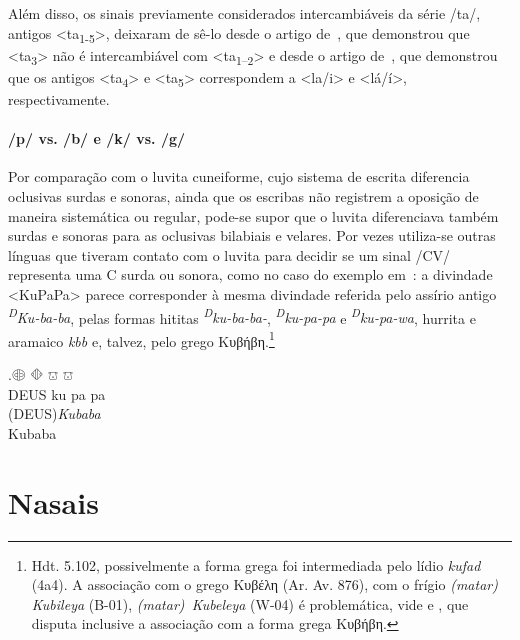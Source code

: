 Além disso, os sinais previamente considerados intercambiáveis da série
/ta/, antigos <ta\textsubscript{1-5}>, deixaram de sê-lo desde o artigo
de~\citet{Rieken2008}, que demonstrou que <ta\textsubscript{3}> não é
intercambiável com <ta\textsubscript{1--2}> e desde o artigo
de~\citet{RiekenYakubovich2010}, que demonstrou que os antigos
<ta\textsubscript{4}> e <ta\textsubscript{5}> correspondem a <la\slash{}i> e
<lá\slash{}í>, respectivamente.

\paragraph{/p/ vs. /b/ e /k/ vs. /g/}
Por comparação com o luvita cuneiforme, cujo sistema de
escrita diferencia oclusivas surdas e sonoras, ainda que os escribas não
registrem a oposição de maneira sistemática ou regular, pode-se supor que o
luvita diferenciava também surdas e sonoras para as oclusivas bilabiais e
velares.
Por vezes utiliza-se outras línguas que tiveram contato com o luvita para
decidir se um sinal /CV/ representa uma C surda ou sonora, como no caso do
exemplo em~\Next: a divindade <KuPaPa> parece corresponder à mesma
divindade referida pelo assírio antigo \emph{\textsuperscript{D}Ku-ba-ba},
pelas formas hititas \emph{\textsuperscript{D}ku-ba-ba-},
\mbox{\emph{\textsuperscript{D}ku-pa-pa}} e \emph{\textsuperscript{D}ku-pa-wa},
hurrita e aramaico \emph{kbb} e, talvez, pelo grego Κυβήβη.\footnote{%
	Hdt. 5.102, possivelmente a forma grega foi intermediada pelo lídio
	\emph{kufad} (4a4).
	A associação com o grego Κυβέλη (Ar. Av. 876), com o frígio
	\emph{(matar) Kubileya} (B-01), \mbox{\emph{(matar) Kubeleya}} (W-04)
	é problemática, vide \citet[280--1]{Obrador2020} e \citet{Oreshko2021},
	que disputa inclusive a associação com a forma grega Κυβήβη.
}


\exg.\Large 𔖖 \Large 𔗜 \Large 𔕸 \Large 𔕸\\
DEUS ku pa pa\\
(DEUS)\emph{Kubaba} \\
Kubaba


\section{Nasais}

